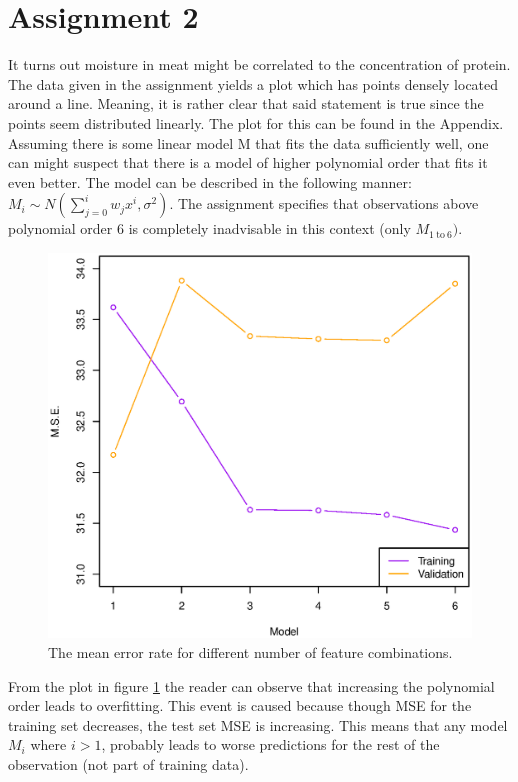 \documentclass[a4paper, twocolumn]{article}
\begin{document}
    \section*{Assignment 2}
    It turns out moisture in meat might be correlated to the concentration of protein. The data given in the assignment yields a plot which has points densely located around a line. Meaning, it is rather clear that said statement is true since the points seem distributed linearly. The plot for this can be found in the Appendix. Assuming there is some linear model M that fits the data sufficiently well, one can might suspect that there is a model of higher polynomial order that fits it even better. The model can be described in the following manner: \(M_i \sim N(\sum_{j=0}^{i} w_{j} x^{i},\sigma^2)\). The assignment specifies that observations above polynomial order 6 is completely inadvisable in this context (only $M_{1 \mathrm{\ to\ } 6})$.

        \begin{figure}[H]
        \centering
        \begin{minipage}[]{0.5\textwidth}
        \includegraphics[width=\textwidth]{share/depends.eps}  
        \caption{The mean error rate for different number of feature combinations.\label{fig:depends} }
        \end{minipage}
        \end{figure}


        From the plot in figure \ref{fig:depends} the reader can observe that increasing the polynomial order leads to overfitting. This event is caused because though MSE for the training set decreases, the test set MSE is increasing. This means that any model \(M_i\) where $i > 1$, probably leads to worse predictions for the rest of the observation (not part of training data).
\end{document}
